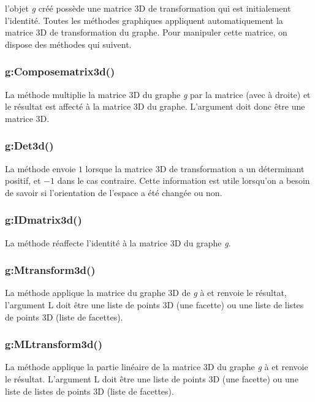 l'objet \emph{g} créé possède une matrice 3D de transformation qui est initialement l'identité. Toutes les méthodes graphiques appliquent automatiquement la matrice 3D de transformation du graphe. Pour manipuler cette matrice, on dispose des méthodes qui suivent.

\subsubsection{g:Composematrix3d()}

La méthode  multiplie la matrice 3D du graphe \emph g par la matrice  (avec  à droite) et le résultat est affecté à la matrice 3D du graphe. L'argument  doit donc être une matrice 3D.

\subsubsection{g:Det3d()}

La méthode  envoie $1$ lorsque la matrice 3D de transformation a un déterminant positif, et $-1$ dans le cas contraire. Cette information est utile lorsqu'on a besoin de savoir si l'orientation de l'espace a été changée ou non.

\subsubsection{g:IDmatrix3d()}

La méthode  réaffecte l'identité à la matrice 3D du graphe \emph g.

\subsubsection{g:Mtransform3d()}

La méthode  applique la matrice du graphe 3D de \emph g à  et renvoie le résultat, l'argument \argu L doit être une liste de points 3D (une facette) ou une liste de listes de points 3D (liste de facettes).

\subsubsection{g:MLtransform3d()}

La méthode  applique la partie linéaire de la matrice 3D du graphe \emph g à  et renvoie le résultat. L'argument \argu L doit être une liste de points 3D (une facette) ou une liste de listes de points 3D (liste de facettes).

